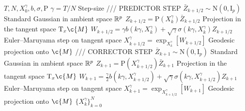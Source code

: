 \begin{algorithm}[!ht]
	\caption{\small GRW-c (Geodesic Random Walk with corrector)}
	\label{alg:grw-c}
	\begin{algorithmic}[1]
		\small
		\Require $T, N, X_0^\gamma, b, \sigma, \mathrm{P}$
		\State $\gamma = T / N$ \Comment Step-size
		\State \textcolor{blue!50!black}{/// PREDICTOR STEP}
		\State \textcolor{blue!50!black}{$\bar{Z}_{k+1/2} \sim \mathrm{N}(0, \mathrm{I}_p)$} \Comment Standard Gaussian in ambient space $\mathbb{R}^p$
		\State \textcolor{blue!50!black}{$Z_{k+1/2} = \mathrm{P}(X_k^\gamma) \bar{Z}_{k+1/2}$} \Comment Projection in the tangent space $\mathrm{T}_x \c{M}$
		\State \textcolor{blue!50!black}{$W_{k+1/2} = \gamma b(k \gamma, X_k^\gamma) + \sqrt{\gamma} \sigma(k \gamma, X_k^\gamma) Z_{k+1/2}$} \Comment Euler--Maruyama step on tangent space
		\State \textcolor{blue!50!black}{$X_{k+1/2}^\gamma = \exp_{X_k^\gamma}[W_{k+1/2}]$} \Comment Geodesic projection onto $\c{M}$
		\State \textcolor{red!50!black}{/// CORRECTOR STEP}
		\State \textcolor{red!50!black}{$\bar{Z}_{k+1} \sim \mathrm{N}(0, \mathrm{I}_p)$} \Comment Standard Gaussian in ambient space $\mathbb{R}^p$
		\State \textcolor{red!50!black}{$Z_{k+1} = \mathrm{P}(X_{k+1/2}^\gamma) \bar{Z}_{k+1}$} \Comment Projection in the tangent space $\mathrm{T}_x \c{M}$
		\State \textcolor{red!50!black}{$W_{k+1} = \tfrac{\gamma}{2} b(k \gamma, X_{k+1/2}^\gamma) + \sqrt{\gamma} \sigma(k \gamma, X_{k+1/2}^\gamma) Z_{k+1}$} \Comment Euler--Maruyama step on tangent space \label{line:dete}
		\State \textcolor{red!50!black}{$X_{k+1}^\gamma = \exp_{X_{k+1/2}^\gamma}[W_{k+1}]$} \Comment Geodesic projection onto $\c{M}$
		\EndFor
		 $\{ X_k^\gamma\}_{k=0}^{N}$
	\end{algorithmic}
\end{algorithm}

